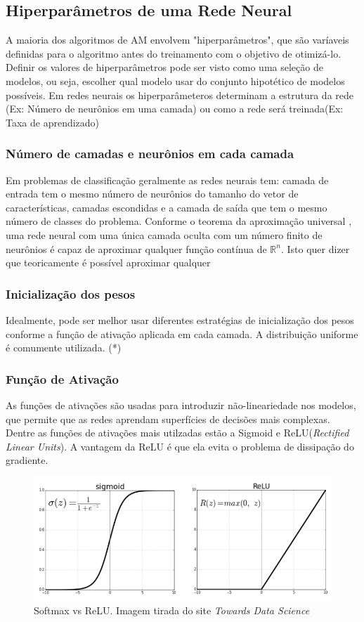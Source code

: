 \subsection{Hiperparâmetros de uma Rede Neural}
A maioria dos algoritmos de AM envolvem "hiperparâmetros", que são varíaveis definidas para o algoritmo antes do treinamento com o objetivo de otimizá-lo. Definir os valores de hiperparâmetros pode ser visto como uma seleção de modelos, ou seja, escolher qual modelo usar do conjunto hipotético de modelos possíveis. Em redes neurais os hiperparâmeteros determinam a estrutura da rede (Ex: Número de neurônios em uma camada) ou como a rede será treinada(Ex: Taxa de aprendizado)

\subsubsection{Número de camadas e neurônios em cada camada}
Em problemas de classificação geralmente as redes neurais tem: camada de entrada tem o mesmo número de neurônios do tamanho do vetor de características, camadas escondidas e a camada de saída que tem o mesmo número de classes do problema. Conforme o teorema da aproximação universal \cite{universal1989}, uma rede neural com uma única camada oculta com um número finito de neurônios é capaz de aproximar qualquer função contínua de $\mathbb{R}^n$. Isto quer dizer que teoricamente é possível aproximar qualquer 
\subsubsection{Inicialização dos pesos}
Idealmente, pode ser melhor usar diferentes estratégias de inicialização dos pesos conforme a função de ativação aplicada em cada camada. A distribuição uniforme é comumente utilizada. (*)

\subsubsection{Função de Ativação}
As funções de ativações são usadas para introduzir não-lineariedade nos modelos, que permite que as redes aprendam superfícies de decisões mais complexas. Dentre as funções de ativações mais utilzadas estão a Sigmoid e ReLU(\textit{Rectified Linear Units}). A vantagem  da ReLU é que ela evita o problema de dissipação do gradiente.


\begin{figure}[H]
	\centering
	\includegraphics[scale=0.4]{pasta1_figuras/activation_function.png}
	\caption{Softmax vs ReLU. Imagem tirada do site \textit{Towards Data Science} \cite{towardsdatascience}}
	\label{fig-activations}
\end{figure}



